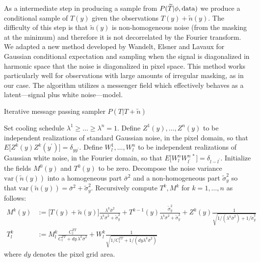 \documentclass[noinfoline]{imsart}
\begin{document}
As a intermediate step in producing a sample from  $P(\widetilde T |  \phi,\text{\rm data})$ we produce a conditional  sample of $T(y)$ given the observations $T(y) + \tilde n(y)$. The difficulty of this step is that $\tilde n(y)$ is non-homogeneous noise (from the masking at the minimum) and therefore it is not decorrelated by the Fourier transform.
We adapted a new method developed by Wandelt, Elsner and Lavaux for Gaussian conditional expectation and sampling when the signal is diagonalized in harmonic space that the noise is diagonalized in pixel space. This method works particularly well for observations with large amounts of irregular masking, as in our case. The algorithm utilizes a messenger field which effectively behaves as a latent---signal plus white noise---model.



\begin{algorithm}[H]
\small
\caption{Iterative message passing sampler  $P(T | T + \tilde n)$}
\label{IMP}
\begin{algorithmic}[1]
\State Set cooling schedule $\lambda^1\geq  \ldots \geq \lambda^n = 1$. 
\State Define $Z^{1}(y), \ldots, Z^{n}(y)$ to be independent realizations of standard Gaussian noise, in the pixel domain, so that $E \bigl[ Z^{k}(y)Z^{k}(y^\prime)\bigr] = \delta_{yy^\prime}$.
\State Define $W^{1}_l, \ldots, W^{n}_l$ to be independent realizations of Gaussian white noise, in the Fourier domain, so that $E\bigl[ W^{n}_l W^{n\,*}_{l^\prime}\bigr] = \delta_{l - l^\prime}$.
\State Initialize the fields $M^0(y)$ and $T^0(y)$  to be zero.
\State Decompose the noise variance $\text{var}(\tilde n(y))$ into a homogeneous part $\bar\sigma^2$ and a non-homogeneous part $\tilde\sigma_y^{2}$ so that $\text{var}(\tilde n(y)) = \bar\sigma^2 + \tilde\sigma_y^{2}$.
\State Recursively compute $T^k, M^k$ for $k=1, \ldots, n$ as follows:
\begin{align}
M^{k}(y) &:= \bigl[T(y) + \tilde n(y) \bigr]\frac{\lambda^{k}\bar\sigma^{2}}{\lambda^{k} \bar\sigma^2 + \tilde \sigma_y^2} + T^{k-1}(y)\frac{\tilde\sigma_y^{2}}{\lambda^k\bar\sigma^2 + \tilde \sigma_y^2}  + Z^{k}(y) \frac{1}{\sqrt{1/(\lambda^k\bar\sigma^{2}) + 1/\tilde\sigma_y^{2}}} \\
T^{k}_l &:= M_l^{k}\frac{C^{TT}_l}{C^{TT}_l + dy \, \lambda^k\bar\sigma^2} + W^{k}_l
\frac{1}{\sqrt{1/C^{TT}_l + 1/(dy \lambda^k\bar\sigma^2)}} 
\end{align}
where  $dy$ denotes the pixel grid area. 
\end{algorithmic}
\end{algorithm}
\end{document}
